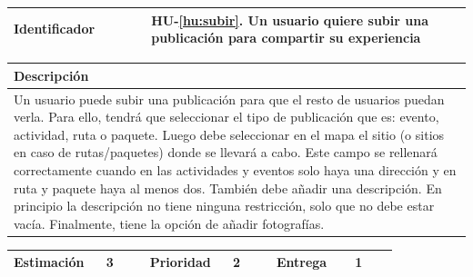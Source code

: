 \documentclass[11pt]{article}
\begin{document}
  \centering
  \begin{longtable}{p{0.3\linewidth}|p{0.7\linewidth}}
    \toprule
    \toprule
    \textbf{Identificador} & \textbf{HU-\ref{hu:subir}}. Un usuario quiere subir una publicación para compartir su experiencia\\
    
    \bottomrule
  \end{longtable}

  \begin{longtable}{p{1.028\linewidth}}
    \textbf{Descripción}\\
    \midrule
    Un usuario puede subir una publicación para que el resto de usuarios puedan verla. Para ello, tendrá que seleccionar el tipo de publicación que es: evento, actividad, ruta o paquete. Luego debe seleccionar en el mapa el sitio (o sitios en caso de rutas/paquetes) donde se llevará a cabo. Este campo se rellenará correctamente cuando en las actividades y eventos solo haya una dirección y en ruta y paquete haya al menos dos. También debe añadir una descripción. En principio la descripción no tiene ninguna restricción, solo que no debe estar vacía. Finalmente, tiene la opción de añadir fotografías. 
  \end{longtable}
  \begin{longtable}{p{0.18\linewidth}|p{0.1\linewidth}|p{0.18\linewidth}|p{0.1\linewidth}|p{0.18\linewidth}|p{0.1\linewidth}}
    \toprule
    \textbf{Estimación} & 3 & \textbf{Prioridad} & 2 & \textbf{Entrega} & 1 \\
    \bottomrule
  \end{longtable}
\end{document}
